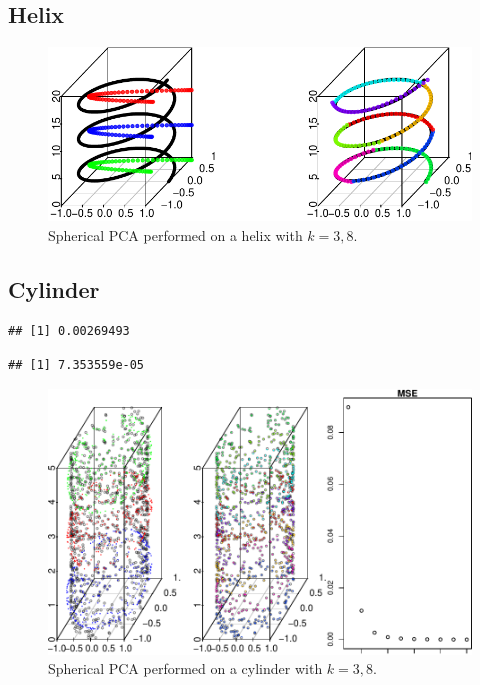 \documentclass[]{article}
\begin{document}
\subsection{Helix}

\begin{figure}[H]

{\centering \includegraphics{Term_paper_files/figure-latex/helix-1} 

}

\caption{Spherical PCA performed on a helix with $k = 3, 8$.}\label{fig:helix}
\end{figure}

\subsection{Cylinder}

\begin{verbatim}
## [1] 0.00269493
\end{verbatim}

\begin{verbatim}
## [1] 7.353559e-05
\end{verbatim}

\begin{figure}[H]

{\centering \includegraphics{Term_paper_files/figure-latex/cylinder-1} 

}

\caption{Spherical PCA performed on a cylinder with $k = 3, 8$.}\label{fig:cylinder}
\end{figure}
\end{document}
